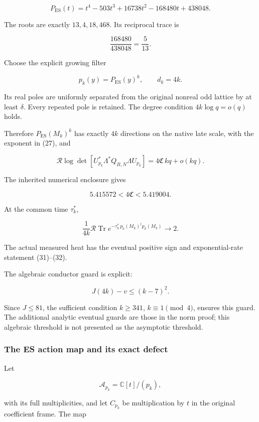 \documentclass[11pt]{article}
\begin{document}
\[
\boxed{
P_{\mathrm{ES}}(t)
=t^4-503t^3+16738t^2-168480t+438048.
}
\tag{50}
\]

The roots are exactly \(13,4,18,468\). Its reciprocal trace is

\[
\frac{168480}{438048}=\frac5{13}.
\]

Choose the explicit growing filter

\[
\boxed{
p_k(y)=P_{\mathrm{ES}}(y)^k,
\qquad d_k=4k.
}
\tag{51}
\]

Its real poles are uniformly separated from the original nonreal odd lattice by at least \(\delta\). Every repeated pole is retained. The degree condition \(4k\log q=o(q)\) holds.

Therefore \(P_{\mathrm{ES}}(M_k)^k\) has exactly \(4k\) directions on the native late scale, with the exponent in (27), and

\[
\boxed{
\mathcal R\log\det
\left[
U_{p_k}^*\Lambda^*Q_{B,N}\Lambda U_{p_k}
\right]
=
4\mathfrak C\,kq+o(kq).
}
\tag{52}
\]

The inherited numerical enclosure gives

\[
\boxed{
5.415572<4\mathfrak C<5.419004.
}
\tag{53}
\]

At the common time \(\tau_k^*\),

\[
\boxed{
\frac1{4k}\mathcal R\operatorname{Tr}
e^{-\tau_k^*\,p_k(M_k)^\dagger p_k(M_k)}
\longrightarrow2.
}
\tag{54}
\]

The actual measured heat has the eventual positive sign and exponential-rate statement (31)--(32).

The algebraic conductor guard is explicit:

\[
J(4k)-v\le(k-7)^2.
\]

Since \(J\le81\), the sufficient condition \(k\ge341\), \(k\equiv1\pmod4\), ensures this guard. The additional analytic eventual guards are those in the norm proof; this algebraic threshold is not presented as the asymptotic threshold.

\subsubsection{The ES action map and its exact defect}\label{the-es-action-map-and-its-exact-defect}

Let

\[
\mathcal A_{p_k}=\mathbb C[t]/(p_k),
\]

with its full multiplicities, and let \(C_{p_k}\) be multiplication by \(t\) in the original coefficient frame. The map
\end{document}
